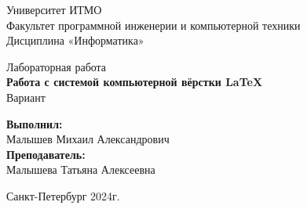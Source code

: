 \thispagestyle{empty}
\begin{center}
    Университет ИТМО
    \\
    Факультет программной инженерии и компьютерной техники
    \\
    Дисциплина «Информатика»

    \vspace{5cm}
    
    {\Large Лабораторная работа }\\[0.2cm]
    {\Large \textbf{Работа с системой компьютерной вёрстки \LaTeX}}\\[0.2cm]
    {\Large Вариант }
    
\end{center}

\vspace{5cm}

\begin{flushright}
    \textbf{Выполнил:}
    \\[0.1cm]
    Малышев Михаил Александрович\\[0.1cm]
    \textbf{Преподаватель:}
    \\[0.1cm]
    Малышева Татьяна Алексеевна\\
\end{flushright}

\vspace{\fill}

\begin{center}
Санкт-Петербург
2024г.
\end{center}